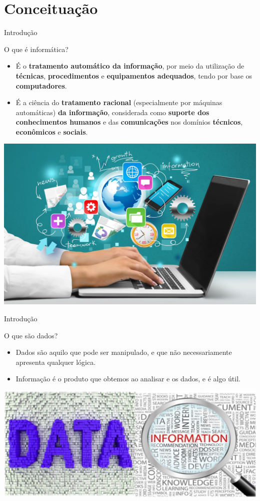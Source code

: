\section{Conceituação}

\begin{frame}{Introdução}
	\begin{block}{O que é informática?}
		\begin{itemize}
			\item É o \textbf{tratamento automático da informação}, por meio da utilização de \textbf{técnicas}, \textbf{procedimentos} e \textbf{equipamentos adequados}, tendo por base os \textbf{computadores}.
			\item É a ciência do \textbf{tratamento racional} (especialmente por
			      máquinas automáticas) \textbf{da informação}, considerada como
			      \textbf{suporte dos conhecimentos humanos} e das \textbf{comunicações} nos
			      domínios \textbf{técnicos}, \textbf{econômicos} e \textbf{sociais}.
		\end{itemize}
	\end{block}

	\centering
	\includegraphics[width=0.45\linewidth]{Figuras/Ch01/fig1}

\end{frame}


\begin{frame}{Introdução}
	\centering
	\scalebox{1.2}{}
\end{frame}


\begin{frame}{O que são dados?}
	\begin{block}{}
		\begin{itemize}
			\item Dados são aquilo que pode ser manipulado, e que não necessariamente apresenta qualquer lógica.
			\item Informação é o produto que obtemos ao analisar e os dados, e é algo útil.
		\end{itemize}
	\end{block}

	\bigskip

	\centering
	\includegraphics[width=1\linewidth]{Figuras/Ch01/fig1.1}
\end{frame}


